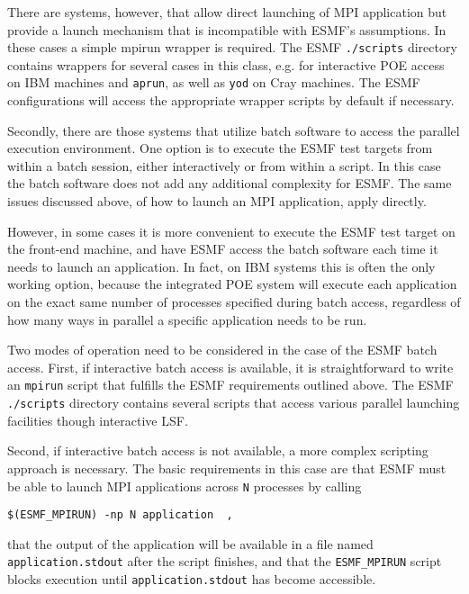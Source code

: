 There are systems, however, that allow direct launching of MPI application but
provide a launch mechanism that is incompatible with ESMF's assumptions. In
these cases a simple mpirun wrapper is required. The ESMF {\tt ./scripts}
directory contains wrappers for several cases in this class, e.g. for
interactive POE access on IBM machines and {\tt aprun}, as well as
{\tt yod} on Cray machines. The ESMF configurations will access the
appropriate wrapper scripts by default if necessary.

Secondly, there are those systems that utilize batch software to access the
parallel execution environment. One option is to execute the ESMF test targets
from within a batch session, either interactively or from within a script. In 
this case the batch software does not add any additional complexity for ESMF.
The same issues discussed above, of how to launch an MPI application, apply 
directly. 

However, in some cases it is more convenient to execute the ESMF test target
on the front-end machine, and have ESMF access the batch software each time it
needs to launch an application. In fact, on IBM systems this is often the only
working option, because the integrated POE system will execute each application
on the exact same number of processes specified during batch access, regardless
of how many ways in parallel a specific application needs to be run.

Two modes of operation need to be considered in the case of the ESMF batch access. First,
if interactive batch access is available, it is straightforward to write an
{\tt mpirun} script that fulfills the ESMF requirements outlined above. The
ESMF {\tt ./scripts} directory contains several scripts that access various
parallel launching facilities though interactive LSF.

Second, if interactive batch access is not available, a more complex scripting
approach is necessary. The basic requirements in this case are that ESMF must
be able to launch MPI applications across {\tt N} processes by calling

\begin{verbatim}
$(ESMF_MPIRUN) -np N application  ,
\end{verbatim}

that the output of the application will be available in a file named
{\tt application.stdout} after the script finishes, and that the
{\tt ESMF\_MPIRUN} script blocks execution until {\tt application.stdout}
has become accessible.

